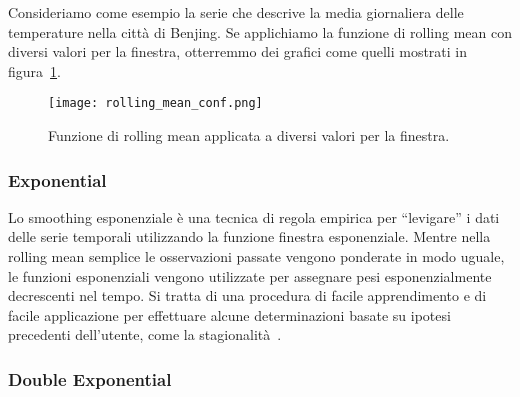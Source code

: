\begin{esempio}
    Consideriamo come esempio la serie che descrive la media giornaliera delle temperature
    nella città di Benjing. Se applichiamo la funzione di rolling mean con diversi
    valori per la finestra, otterremmo dei grafici come quelli mostrati in figura~\ref*{fig:rolling_mean_conf}.
    
    \begin{figure}[H]
        \centering
        \texttt{[image: rolling\_mean\_conf.png]}
        \caption{Funzione di rolling mean applicata a diversi valori per la finestra.}
        \label{fig:rolling_mean_conf}
    \end{figure}

\end{esempio}




\subsubsection{Exponential}
Lo smoothing esponenziale è una tecnica di regola empirica 
per ``levigare'' i dati delle serie temporali utilizzando la funzione finestra esponenziale.
Mentre nella rolling mean semplice le osservazioni passate vengono ponderate 
in modo uguale, le funzioni esponenziali vengono utilizzate per assegnare 
pesi esponenzialmente decrescenti nel tempo. 
Si tratta di una procedura di facile apprendimento e di facile applicazione 
per effettuare alcune determinazioni basate su ipotesi precedenti dell'utente, 
come la stagionalità~\cite{wiki:exp_smot}.


\subsubsection{Double Exponential}
